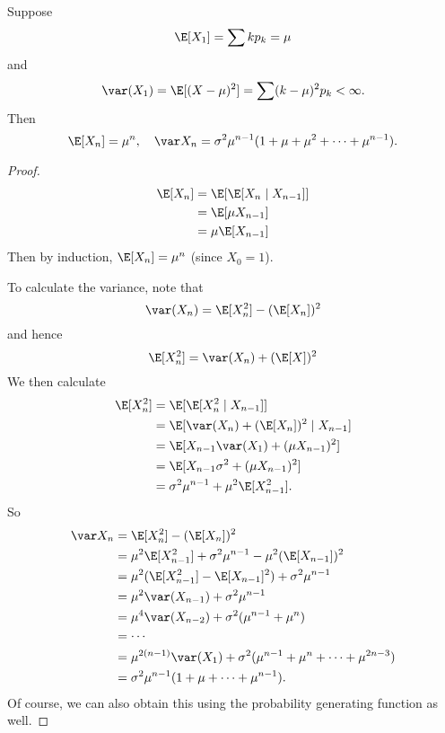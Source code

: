 \documentclass[a4paper]{article}
\begin{document}
\begin{thm}
  Suppose
  \[
    \E[X_1] = \sum k p_k = \mu
  \]
  and
  \[
    \var (X_1) = \E[(X - \mu)^2] = \sum (k - \mu)^2 p_k < \infty.
  \]
  Then
  \[
    \E[X_n] = \mu^n,\quad \var X_n = \sigma^2\mu^{n - 1}(1 + \mu + \mu^2 + \cdots + \mu^{n - 1}).
  \]
\end{thm}
\begin{proof}
\begin{align*}
  \E[X_n] &= \E[\E[X_n\mid X_{n - 1}]]\\
  &= \E[\mu X_{n - 1}]\\
  &= \mu \E[X_{n - 1}]
\end{align*}
Then by induction, $\E[X_n] = \mu^n$ (since $X_0 = 1$).

To calculate the variance, note that
\[
  \var (X_n) = \E[X_n^2] - (\E[X_n])^2
\]
and hence
\[
  \E[X_n^2] = \var(X_n) + (\E[X])^2
\]
We then calculate
\begin{align*}
  \E[X_n^2] &= \E[\E[X_n^2\mid X_{n - 1}]]\\
  &= \E[\var(X_n) + (\E[X_n])^2 \mid X_{n - 1}]\\
  &= \E[X_{n - 1}\var (X_1) + (\mu X_{n - 1})^2]\\
  &= \E[X_{n - 1}\sigma^2 + (\mu X_{n - 1})^2]\\
  &= \sigma^2 \mu^{n - 1} + \mu^2 \E[X_{n - 1}^2].
\end{align*}
So
\begin{align*}
  \var X_n &= \E[X_n^2] - (\E[X_n])^2 \\
  &= \mu^2 \E[X_{n -1}^2] + \sigma^2 \mu^{n - 1} - \mu^2 (\E[X_{n - 1}])^2\\
  &= \mu^2(\E[X_{n - 1}^2] - \E[X_{n - 1}]^2) + \sigma^2\mu^{n - 1}\\
  &= \mu^2 \var (X_{n - 1}) + \sigma^2 \mu^{n -1 }\\
  &= \mu^4 \var(X_{n - 2}) + \sigma^2(\mu^{n - 1} + \mu^n)\\
  &= \cdots\\
  &= \mu^{2(n - 1)}\var (X_1) + \sigma^2 (\mu^{n - 1} + \mu^{n} + \cdots + \mu^{2n - 3})\\
  &= \sigma^2\mu^{n - 1}(1 + \mu + \cdots + \mu^{n - 1}).
\end{align*}
Of course, we can also obtain this using the probability generating function as well.
\end{proof}
\end{document}
